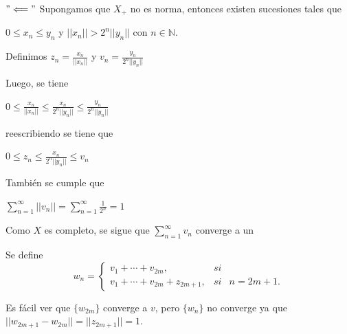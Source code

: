 

\begin{frame}{}
    $  " \Longleftarrow " $ Supongamos que  $ X_{+} $ no es norma, entonces existen sucesiones tales que 

    $ 0 \leq x_{n} \leq y_{n} $ y $ || x_{n} || > 2^{n} || y_{n} || $ con $  n \in \mathbb{N} $.




Definimos $ z_{n} = \frac{x_{n}}{|| x_{n}|| }  $  y $  v_{n} = \frac{y_{n}}{2^{n} ||y_{n}|| }  $

Luego, se tiene 

$  0 \leq  \frac{x_{n}}{|| x_{n}|| }   \leq  \frac{x_{n}}{ 2^{n} || y_{n}|| } \leq \frac{y_{n}}{2^{n} ||y_{n}|| }   $


reescribiendo se tiene que 



$  0 \leq  z_{n}  \leq  \frac{x_{n}}{ 2^{n} || y_{n}|| } \leq  v_{n}   $



    También se cumple que 


    $  \sum_{n=1}^{\infty} || v_{n} || = \sum_{n=1}^{\infty} \frac{1}{2^{n}} = 1  $


    Como $X$ es completo, se sigue que $  \sum_{n=1}^{\infty}  v_{n}   $ converge a un %
\end{frame}





\begin{frame}{}
    Se define 
                \[ w_{n} = \left\{ \begin{array}{lcc}
             v_{1} + \cdots + v_{2m} , &   si  &  %
             \\  v_{1} + \cdots + v_{2m}  + z_{2m+1}  ,  &  si  & n = 2m+1 . 
             \end{array}
   \right. \]


Es fácil ver que $ \{ w_{2m} \} $ converge a $v$, pero $ \{ w_{n} \} $ no converge ya que $ || w_{2m+1} - w_{2m} || = || z_{2m+1} || = 1 $.


    
\end{frame}


